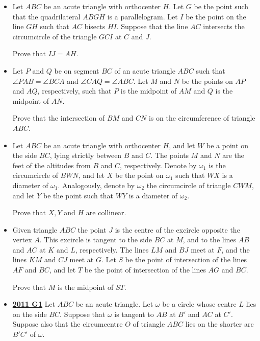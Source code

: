 \documentclass[11pt]{scrartcl}
\begin{document}
\begin{itemize}[leftmargin=*]
Prove that $BD,FX$ and $ME$ are concurrent.
\item {} 	Let $ABC$ be an acute triangle with orthocenter $H$. Let $G$ be the point such that the quadrilateral $ABGH$ is a parallelogram. Let $I$ be the point on the line $GH$ such that $AC$ bisects $HI$. Suppose that the line $AC$ intersects the circumcircle of the triangle $GCI$ at $C$ and $J$. 

Prove that $IJ = AH$.
\item {}  Let $P$ and $Q$ be on segment $BC$ of an acute triangle $ABC$ such that $\angle PAB=\angle BCA$ and $\angle CAQ=\angle ABC$. Let $M$ and $N$ be the points on $AP$ and $AQ$, respectively, such that $P$ is the midpoint of $AM$ and $Q$ is the midpoint of $AN$. 

Prove that the intersection of $BM$ and $CN$ is on the circumference of triangle $ABC$.
\item {}  	Let $ABC$ be an acute triangle with orthocenter $H$, and let $W$ be a point on the side $BC$, lying strictly between $B$ and $C$. The points $M$ and $N$ are the feet of the altitudes from $B$ and $C$, respectively. Denote by $\omega_1$ is the circumcircle of $BWN$, and let $X$ be the point on $\omega_1$ such that $WX$ is a diameter of $\omega_1$. Analogously, denote by $\omega_2$ the circumcircle of triangle $CWM$, and let $Y$ be the point such that $WY$ is a diameter of $\omega_2$. 

Prove that $X,Y$ and $H$ are collinear.
\item {}  	Given triangle $ABC$ the point $J$ is the centre of the excircle opposite the vertex $A$. This excircle is tangent to the side $BC$ at $M$, and to the lines $AB$ and $AC$ at $K$ and $L$, respectively. The lines $LM$ and $BJ$ meet at $F$, and the lines $KM$ and $CJ$ meet at $G$. Let $S$ be the point of intersection of the lines $AF$ and $BC$, and let $T$ be the point of intersection of the lines $AG$ and $BC$. 

Prove that $M$ is the midpoint of $ST.$ 
\item \href{https://artofproblemsolving.com/community/c6h488823p2739318}{\textbf{2011 G1}} Let $ABC$ be an acute triangle. Let $\omega$ be a circle whose centre $L$ lies on the side $BC$. Suppose that $\omega$ is tangent to $AB$ at $B'$ and $AC$ at $C'$. Suppose also that the circumcentre $O$ of triangle $ABC$ lies on the shorter arc $B'C'$ of $\omega$. 


\end{itemize}
\end{document}
